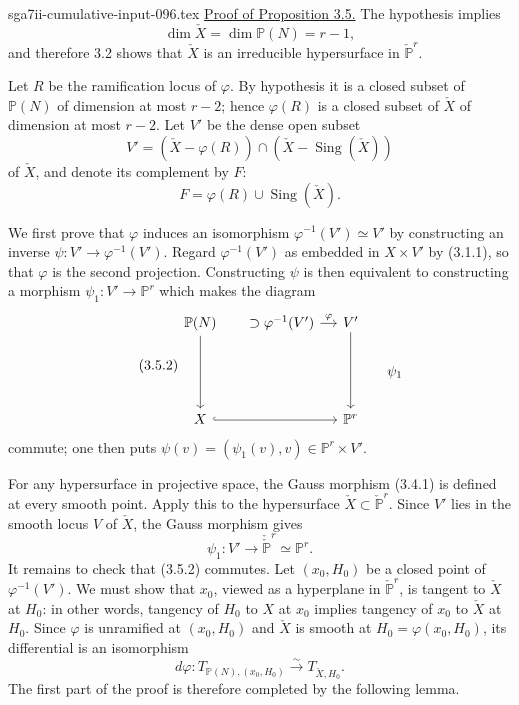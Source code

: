 \begin{filecontents*}{sga7ii-cumulative-input-096.tex}
\noindent\underline{Proof of Proposition 3.5.}
The hypothesis implies
\[
\dim\check X=\dim\mathbb P(N)=r-1,
\]
and therefore 3.2 shows that $\check X$ is an irreducible hypersurface
in $\check{\mathbb P}^{r}$.

Let $R$ be the ramification locus of $\varphi$.  By hypothesis it is
a closed subset of $\mathbb P(N)$ of dimension at most $r-2$; hence
$\varphi(R)$ is a closed subset of $\check X$ of dimension at most
$r-2$.  Let $V'$ be the dense open subset
\begin{equation}\tag{3.5.1}
V'=(\check X-\varphi(R))\cap
   (\check X-\operatorname{Sing}(\check X))
\end{equation}
of $\check X$, and denote its complement by $F$:
\begin{equation}\tag{3.5.1.1}
F=\varphi(R)\cup\operatorname{Sing}(\check X).
\end{equation}

We first prove that $\varphi$ induces an isomorphism
$\varphi^{-1}(V')\simeq V'$ by constructing an inverse
$\psi:V'\to\varphi^{-1}(V')$.  Regard $\varphi^{-1}(V')$ as embedded
in $X\times V'$ by (3.1.1), so that $\varphi$ is the second
projection.  Constructing $\psi$ is then equivalent to constructing a
morphism $\psi_1:V'\to\mathbb P^r$ which makes the diagram
\begin{equation}\tag{3.5.2}
\begin{tikzcd}[column sep=small]
\mathbb P(N) \arrow[dd]
  & {}\supset\varphi^{-1}(V') \arrow[r,"\varphi"]
  & V' \arrow[dd] & \\
  & & & \psi_1 \\
X \arrow[rr,hook] & & \mathbb P^r &
\end{tikzcd}
\end{equation}
commute; one then puts
$\psi(v)=(\psi_1(v),v)\in\mathbb P^r\times V'$.

For any hypersurface in projective space, the Gauss morphism (3.4.1)
is defined at every smooth point.  Apply this to the hypersurface
$\check X\subset\check{\mathbb P}^{r}$.  Since $V'$ lies in the
smooth locus $V$ of $\check X$, the Gauss morphism gives
\begin{equation}\tag{3.5.3}
\psi_1:V'\longrightarrow
\check{\check{\mathbb P}}^{r}\simeq\mathbb P^r.
\end{equation}
It remains to check that (3.5.2) commutes.  Let $(x_0,H_0)$ be a
closed point of $\varphi^{-1}(V')$.  We must show that $x_0$, viewed
as a hyperplane in $\check{\mathbb P}^{r}$, is tangent to $\check X$
at $H_0$: in other words, tangency of $H_0$ to $X$ at $x_0$ implies
tangency of $x_0$ to $\check X$ at $H_0$.  Since $\varphi$ is
unramified at $(x_0,H_0)$ and $\check X$ is smooth at
$H_0=\varphi(x_0,H_0)$, its differential is an isomorphism
\begin{equation}\tag{3.5.4}
d\varphi:
T_{\mathbb P(N),(x_0,H_0)}\xrightarrow{\sim}T_{\check X,H_0}.
\end{equation}
The first part of the proof is therefore completed by the following
lemma.
\end{filecontents*}
